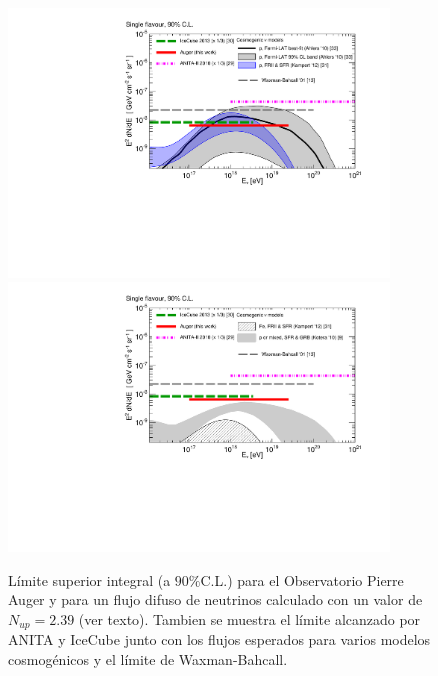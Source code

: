 	\begin{figure}[ht!]
		\begin{center}
			\includegraphics[width=0.9\textwidth]{fig/resultadosAuger/integral_limits_and_models_paper_combined_proton}\\
			\includegraphics[width=0.9\textwidth]{fig/resultadosAuger/integral_limits_and_models_paper_combined_heavy}
			\caption{\label{fig:intLimits}
			L\'imite superior integral (a $90\%$C.L.) para el Observatorio Pierre Auger y para un flujo difuso de neutrinos calculado con un valor de $N_{up}=2.39$ (ver texto).
			Tambien se muestra el l\'imite alcanzado por ANITA\cite{XXX} y IceCube\cite{XXX2} junto con los flujos esperados para varios modelos cosmog\'enicos\cite{XXX} y el l\'imite de Waxman-Bahcall\cite{XXX2}.}
		\end{center}
	\end{figure}
	
